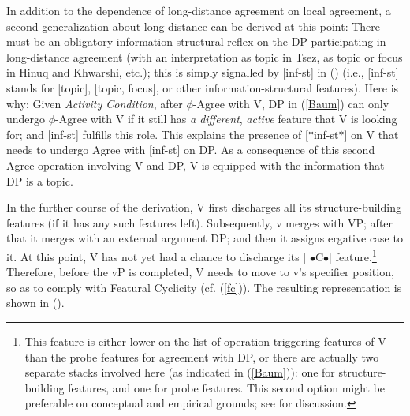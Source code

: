 \documentclass[output=paper
,modfonts
,nonflat]{langsci/langscibook}
\begin{document}
	In addition to the dependence of long-distance agreement on local
	agreement, a second generalization about long-distance can be derived
	at this point: There must be an obligatory information-structural
	reflex on the DP participating in long-distance agreement (with an
	interpretation as topic in Tsez, as topic or focus in Hinuq and
	Khwarshi, etc.); this is simply signalled by [inf-st] in (\Last) (i.e.,
	[inf-st] stands for [topic], [topic, focus], or other
	information-structural features). Here is why: 
	Given   {\itshape Activity Condition}, after $\phi$-Agree
	with V, DP in (\ref{Baum}) can only undergo $\phi$-Agree
	with V if it still has {\itshape a different}, {\itshape active} feature
	that V is looking for; and [inf-st] fulfills this role.
	This explains the presence of [$\ast$inf-st$\ast$] on V that needs to undergo
	Agree with [inf-st] on  DP. As a consequence of this second
	Agree operation involving V and DP, V is equipped with the
	information that DP is a topic. 
	
	In the further course of the derivation, V first discharges all its
	structure-building features (if it has any such features
	left). Subsequently, v merges with VP; after that it merges 
	with an external argument DP; and then it assigns ergative case to it. At
	this point, V has not yet had a chance to discharge its [{\small
		$\bullet$}C{\small $\bullet$}] feature.\footnote{This
		feature is either lower on the list of operation-triggering
		features of V than the probe features for agreement with
		DP, or there are actually two separate stacks involved here
		(as indicated in (\ref{Baum})):
		one for structure-building features, and one for probe
		features. This second option might be preferable on conceptual and empirical
		grounds; see \cite{Mueller:04:arg,Mueller:09:eao} for discussion.}
	Therefore, before
	the vP is completed, V needs to move to v's specifier position, so
	as to comply with Featural Cyclicity (cf. (\ref{fc})). The resulting
	representation is shown in (\Next).
	
\end{document}
